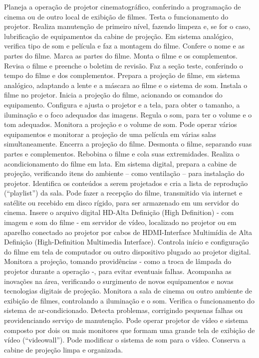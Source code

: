 \documentclass[
]{article}
\begin{document}
Planeja a operação de projetor cinematográfico, conferindo a programação
de cinema ou de outro local de exibição de filmes. Testa o funcionamento
do projetor. Realiza manutenção de primeiro nível, fazendo limpeza e, se
for o caso, lubrificação de equipamentos da cabine de projeção. Em
sistema analógico, verifica tipo de som e película e faz a montagem do
filme. Confere o nome e as partes do filme. Marca as partes do filme.
Monta o filme e os complementos. Revisa o filme e preenche o boletim de
revisão. Faz a seção teste, conferindo o tempo do filme e dos
complementos. Prepara a projeção de filme, em sistema analógico,
adaptando a lente e a máscara ao filme e o sistema de som. Instala o
filme no projetor. Inicia a projeção do filme, acionando os comandos do
equipamento. Configura e ajusta o projetor e a tela, para obter o
tamanho, a iluminação e o foco adequados das imagens. Regula o som, para
ter o volume e o tom adequados. Monitora a projeção e o volume de som.
Pode operar vários equipamentos e monitorar a projeção de uma película
em várias salas simultaneamente. Encerra a projeção do filme. Desmonta o
filme, separando suas partes e complementos. Rebobina o filme e cola
suas extremidades. Realiza o acondicionamento do filme em lata. Em
sistema digital, prepara a cabine de projeção, verificando itens do
ambiente -- como ventilação -- para instalação do projetor. Identifica
os conteúdos a serem projetados e cria a lista de reprodução
(``playlist'') da sala. Pode fazer a recepção do filme, transmitido via
internet e satélite ou recebido em disco rígido, para ser armazenado em
um servidor do cinema. Insere o arquivo digital HD-Alta Definição (High
Definition) - com imagem e som do filme - em servidor de vídeo,
localizado no projetor ou em aparelho conectado ao projetor por cabos de
HDMI-Interface Multimídia de Alta Definição (High-Definition Multimedia
Interface). Controla início e configuração do filme em tela de
computador ou outro dispositivo plugado ao projetor digital. Monitora a
projeção, tomando providências - como a troca de lâmpada do projetor
durante a operação -, para evitar eventuais falhas. Acompanha as
inovações na área, verificando o surgimento de novos equipamentos e
novas tecnologias digitais de projeção. Monitora a sala de cinema ou
outro ambiente de exibição de filmes, controlando a iluminação e o som.
Verifica o funcionamento do sistema de ar-condicionado. Detecta
problemas, corrigindo pequenas falhas ou providenciando serviço de
manutenção. Pode operar projetor de vídeo e sistema composto por dois ou
mais monitores que formam uma grande tela de exibição de vídeo
(``videowall''). Pode modificar o sistema de som para o vídeo. Conserva
a cabine de projeção limpa e organizada.
\end{document}
